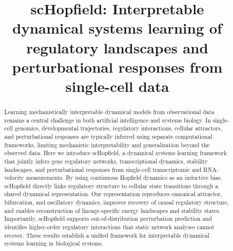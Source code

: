 \documentclass[11pt]{article}
\title{\textbf{scHopfield: Interpretable dynamical systems learning of regulatory landscapes and perturbational responses from single-cell data}}
\author{}
\date{}
\begin{document}
\maketitle
\vspace{-2em}

\begin{abstract}
Learning mechanistically interpretable dynamical models from observational data remains a central challenge in both artificial intelligence and systems biology. In single-cell genomics, developmental trajectories, regulatory interactions, cellular attractors, and perturbational responses are typically inferred using separate computational frameworks, limiting mechanistic interpretability and generalization beyond the observed data. Here we introduce scHopfield, a dynamical systems learning framework that jointly infers gene regulatory networks, transcriptional dynamics, stability landscapes, and perturbational responses from single-cell transcriptomic and RNA-velocity measurements. By using continuous Hopfield dynamics as an inductive bias, scHopfield directly links regulatory structure to cellular state transitions through a shared dynamical representation. Our representation reproduces canonical attractor, bifurcation, and oscillatory dynamics, improves recovery of causal regulatory structure, and enables reconstruction of lineage-specific energy landscapes and stability states. Importantly, scHopfield supports out-of-distribution perturbation prediction and identifies higher-order regulatory interactions that static network analyses cannot recover. These results establish a unified framework for interpretable dynamical systems learning in biological systems.

\end{abstract}
\end{document}
